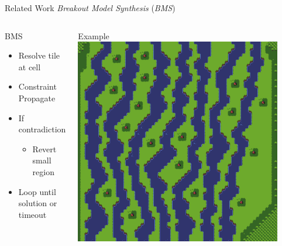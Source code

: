 \documentclass{beamer}
\begin{document}
  \begin{frame}[fragile]{Related Work}
    \textit{Breakout Model Synthesis} (\textit{BMS})
    \begin{columns}[T,onlytextwidth]
        \begin{block}{BMS}
          \hfill \\
          \begin{itemize}
            \item Resolve tile at cell
            \item Constraint Propagate
            \item If contradiction
              \begin{itemize}
                \item Revert small region
              \end{itemize}
            \item Loop until solution or timeout
          \end{itemize}
        \end{block}
        \begin{block}{Example}
          \includegraphics[width=0.9\textwidth]{img/forestmicro_64x64.pdf}
        \end{block}
    \end{columns}
  \end{frame}
\end{document}
